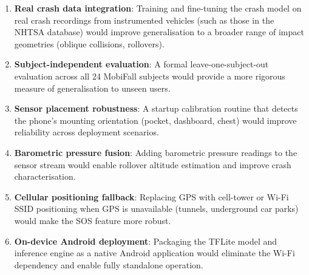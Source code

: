 \begin{enumerate}
    \item \textbf{Real crash data integration}: Training and fine-tuning the crash model on real crash recordings from instrumented vehicles (such as those in the NHTSA database) would improve generalisation to a broader range of impact geometries (oblique collisions, rollovers).

    \item \textbf{Subject-independent evaluation}: A formal leave-one-subject-out evaluation across all 24 MobiFall subjects would provide a more rigorous measure of generalisation to unseen users.

    \item \textbf{Sensor placement robustness}: A startup calibration routine that detects the phone's mounting orientation (pocket, dashboard, chest) would improve reliability across deployment scenarios.

    \item \textbf{Barometric pressure fusion}: Adding barometric pressure readings to the sensor stream would enable rollover altitude estimation and improve crash characterisation.

    \item \textbf{Cellular positioning fallback}: Replacing GPS with cell-tower or Wi-Fi SSID positioning when GPS is unavailable (tunnels, underground car parks) would make the SOS feature more robust.

    \item \textbf{On-device Android deployment}: Packaging the TFLite model and inference engine as a native Android application would eliminate the Wi-Fi dependency and enable fully standalone operation.
\end{enumerate}
